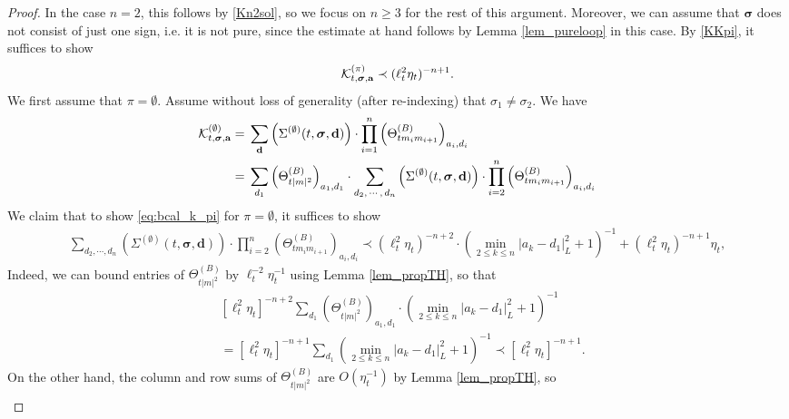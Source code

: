 \begin{proof}
In the case $n=2$, this follows by \eqref{Kn2sol}, so we focus on $n\geq3$ for the rest of this argument. Moreover, we can assume that $\boldsymbol{\sigma}$ does not consist of just one sign, i.e. it is not pure, since the estimate at hand follows by Lemma \ref{lem_pureloop} in this case. By \eqref{KKpi}, it suffices to show
\begin{equation}\label{eq:bcal_k_pi}
  {\cal K}^{(\pi)}_{t, \boldsymbol{\sigma}, \textbf{a}} \prec (\ell_t^{2}\eta_t)^{-n+1} .    
\end{equation}
We first assume that $\pi=\emptyset$. Assume without loss of generality (after re-indexing) that $\sigma_{1}\neq\sigma_{2}$. We have 
\begin{align*}
{\cal K}^{(\emptyset)}_{t, \boldsymbol{\sigma}, \textbf{a}}
=\;&
 \sum_{\textbf{d}}\left(\Sigma^{(\emptyset)}(t, \boldsymbol{\sigma}, \textbf{d})\right)
\cdot 
\prod_{i=1}^n \left(\Theta^{(B)}_{tm_im_{i+1}}\right)_{a_i, d_i}
\\\nonumber
=\;&\sum_{d_1}\left(\Theta^{(B)}_{t|m|^2}\right)_{a_1, d_1}
\cdot \sum_{d_2,\,\cdots,\, d_n}\left(\Sigma^{(\emptyset)}(t, \boldsymbol{\sigma}, \textbf{d})\right)
\cdot 
\prod_{i=2}^n \left(\Theta^{(B)}_{tm_im_{i+1}}\right)_{a_i, d_i}  
\end{align*}
We claim that to show \eqref{eq:bcal_k_pi} for $\pi=\emptyset$, it suffices to show
\begin{align}\label{spwow3}
\sum_{d_2, \cdots, d_n}\left(\Sigma^{(\emptyset)}(t, \boldsymbol{\sigma}, \mathbf{d})\right) \cdot \prod_{i=2}^n\left(\Theta_{t m_i m_{i+1}}^{(B)}\right)_{a_i, d_i} \prec (\ell^2_t \eta_t)^{-n+2} \cdot\left(\min _{2 \leq k \leq n}\left|a_k-d_1\right|_{L}^2+1\right)^{-1}+(\ell_{t}^{2}\eta_{t})^{-n+1}\eta_{t},
\end{align}
Indeed, we can bound entries of $\Theta^{(B)}_{t|m|^{2}}$ by $\ell_{t}^{-2}\eta_{t}^{-1}$ using Lemma \ref{lem_propTH}, so that
%
\begin{align*}
&[\ell^2_t \eta_t]^{-n+2}\sum_{d_1}\left(\Theta^{(B)}_{t|m|^2}\right)_{a_1, d_1} \cdot\left(\min _{2 \leq k \leq n}\left|a_k-d_1\right|_{L}^2+1\right)^{-1}\\
&=[\ell^2_t \eta_t]^{-n+1}\sum_{d_{1}}\left(\min _{2 \leq k \leq n}\left|a_k-d_1\right|_{L}^2+1\right)^{-1}\prec [\ell^2_t \eta_t]^{-n+1}.
\end{align*}
%
On the other hand, the column and row sums of $\Theta^{(B)}_{t|m|^{2}}$ are $O(\eta_{t}^{-1})$ by Lemma \ref{lem_propTH}, so
%
\begin{align*}

\end{align*}
\end{proof}
